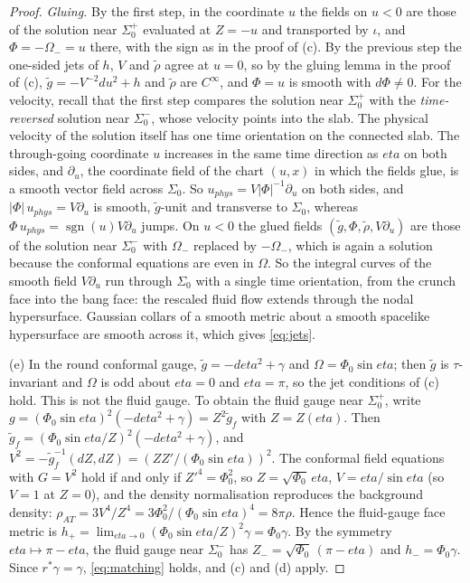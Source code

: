 \documentclass[11pt]{article}
\theoremstyle{canonmath}
\theoremstyle{canonpostulate}
\theoremstyle{canonproposition}
\theoremstyle{canonmath}
\theoremstyle{canonproposition}
\def\mathrm#1{#1}%
\def\eta{eta}%
\begin{document}
\begin{proof}
\emph{Gluing.} By the first step, in the coordinate $u$ the fields on $u<0$ are those of the solution near $\Sigma_0^+$ evaluated at $Z = -u$ and transported by $\iota$, and $\Phi = -\Omega_- = u$ there, with the sign as in the proof of (c). By the previous step the one-sided jets of $h$, $V$ and $\tilde\rho$ agree at $u = 0$, so by the gluing lemma in the proof of (c), $\tilde g = -V^{-2}du^2 + h$ and $\tilde\rho$ are $C^\infty$, and $\Phi = u$ is smooth with $d\Phi\neq0$. For the velocity, recall that the first step compares the solution near $\Sigma_0^+$ with the \emph{time-reversed} solution near $\Sigma_0^-$, whose velocity points into the slab. The physical velocity of the solution itself has one time orientation on the connected slab. The through-going coordinate $u$ increases in the same time direction as $\eta$ on both sides, and $\partial_u$, the coordinate field of the chart $(u,x)$ in which the fields glue, is a smooth vector field across $\Sigma_0$. So $u_{\mathrm{phys}} = V|\Phi|^{-1}\partial_u$ on both sides, and $|\Phi|\,u_{\mathrm{phys}} = V\partial_u$ is smooth, $\tilde g$-unit and transverse to $\Sigma_0$, whereas $\Phi\,u_{\mathrm{phys}} = \operatorname{sgn}(u)V\partial_u$ jumps. On $u<0$ the glued fields $(\tilde g,\Phi,\tilde\rho,V\partial_u)$ are those of the solution near $\Sigma_0^-$ with $\Omega_-$ replaced by $-\Omega_-$, which is again a solution because the conformal equations are even in $\Omega$. So the integral curves of the smooth field $V\partial_u$ run through $\Sigma_0$ with a single time orientation, from the crunch face into the bang face: the rescaled fluid flow extends through the nodal hypersurface. Gaussian collars of a smooth metric about a smooth spacelike hypersurface are smooth across it, which gives \eqref{eq:jets}.

(e) In the round conformal gauge, $\tilde{g} = -d\eta^2 + \gamma$ and $\Omega = \Phi_0\sin\eta$; then $\tilde g$ is $\tau$-invariant and $\Omega$ is odd about $\eta = 0$ and $\eta = \pi$, so the jet conditions of (c) hold. This is not the fluid gauge. To obtain the fluid gauge near $\Sigma_0^+$, write $g = (\Phi_0\sin\eta)^2(-d\eta^2+\gamma) = Z^2\tilde g_f$ with $Z = Z(\eta)$. Then $\tilde g_f = (\Phi_0\sin\eta/Z)^2(-d\eta^2+\gamma)$, and $V^2 = -\tilde g_f^{-1}(dZ,dZ) = (ZZ'/(\Phi_0\sin\eta))^2$. The conformal field equations \cite[(22)]{AnguigeTod1999a} with $G = V^2$ hold if and only if $Z'^4 = \Phi_0^2$, so $Z = \sqrt{\Phi_0}\,\eta$, $V = \eta/\sin\eta$ (so $V = 1$ at $Z = 0$), and the density normalisation reproduces the background density: $\rho_{\mathrm{AT}} = 3V^4/Z^4 = 3\Phi_0^2/(\Phi_0\sin\eta)^4 = 8\pi\rho$. Hence the fluid-gauge face metric is $h_+ = \lim_{\eta\to0}(\Phi_0\sin\eta/Z)^2\gamma = \Phi_0\gamma$. By the symmetry $\eta\mapsto\pi-\eta$, the fluid gauge near $\Sigma_0^-$ has $Z_- = \sqrt{\Phi_0}\,(\pi-\eta)$ and $h_- = \Phi_0\gamma$. Since $r^*\gamma = \gamma$, \eqref{eq:matching} holds, and (c) and (d) apply.
\end{proof}
\end{document}
